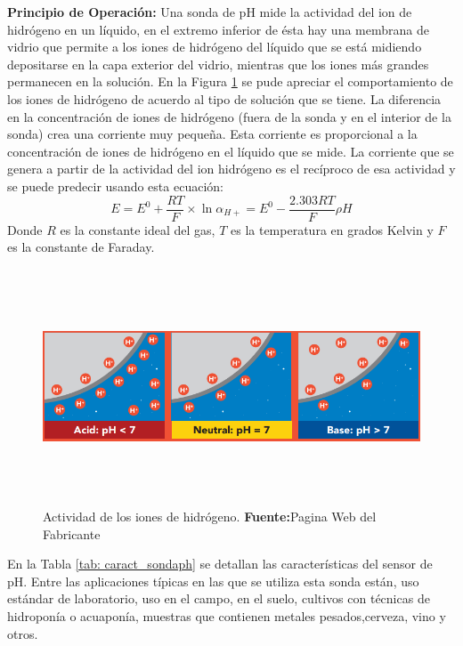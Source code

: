 \textbf{Principio de Operación: }Una sonda de pH mide la actividad del ion de hidrógeno en un líquido, en el extremo inferior de ésta hay una membrana de vidrio que permite a los iones de hidrógeno del líquido que se está midiendo depositarse en la capa exterior del vidrio, mientras que los iones más grandes permanecen en la solución. En la Figura \ref{fig:4.11} se pude apreciar el comportamiento de los iones de hidrógeno de acuerdo al tipo de solución que se tiene. La diferencia en la concentración de iones de hidrógeno (fuera de la sonda y en el interior de la sonda) crea una corriente muy pequeña. Esta corriente es proporcional a la concentración de iones de hidrógeno en el líquido que se mide.
La corriente que se genera a partir de la actividad del ion hidrógeno es el recíproco de esa actividad y se puede predecir usando esta ecuación:
\begin{equation}
E=E^0 + \frac{RT}{F}\times \ln\alpha_{H+} = E^0 - \frac{2.303RT}{F}\rho H
\label{eq:iv}
\end{equation}
Donde $R$ es la constante ideal del gas, $T$ es la temperatura en grados Kelvin y $F$ es la constante de Faraday.
\newline
\hfill
\begin{figure}[t]
\centering
	\includegraphics[width=160mm, height=70mm]{Imagenes/2021/imag22.png}%
	\caption[Actividad de los iones de hidrógeno]{Actividad de los iones de hidrógeno.  \textbf{Fuente:}Pagina Web del Fabricante \cite{atlasph}}
	\label{fig:4.11}
\end{figure}

En la Tabla \ref{tab: caract_sondaph} se detallan las características del sensor de pH.
\newline
\hfill
Entre las aplicaciones típicas en las que se utiliza esta sonda están, uso estándar de laboratorio, uso en el campo, en el suelo, cultivos con técnicas de hidroponía o acuaponía, muestras que contienen metales pesados,cerveza, vino y otros.

